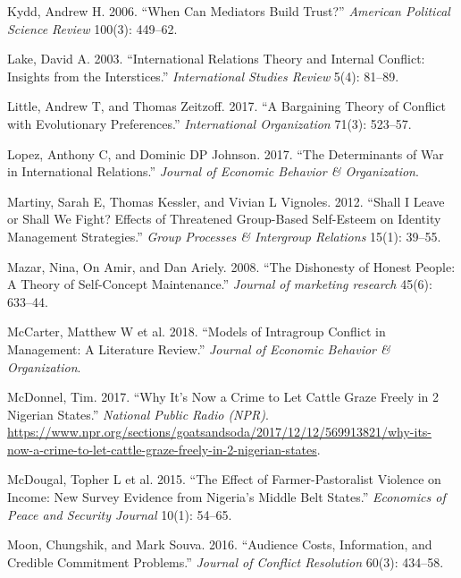 \documentclass[11pt]{article}
\begin{document}
\leavevmode\hypertarget{ref-kydd2006can}{}%
Kydd, Andrew H. 2006. ``When Can Mediators Build Trust?'' \emph{American
Political Science Review} 100(3): 449--62.

\leavevmode\hypertarget{ref-lake2003international}{}%
Lake, David A. 2003. ``International Relations Theory and Internal
Conflict: Insights from the Interstices.'' \emph{International Studies
Review} 5(4): 81--89.

\leavevmode\hypertarget{ref-little2017bargaining}{}%
Little, Andrew T, and Thomas Zeitzoff. 2017. ``A Bargaining Theory of
Conflict with Evolutionary Preferences.'' \emph{International
Organization} 71(3): 523--57.

\leavevmode\hypertarget{ref-lopez2017determinants}{}%
Lopez, Anthony C, and Dominic DP Johnson. 2017. ``The Determinants of
War in International Relations.'' \emph{Journal of Economic Behavior \&
Organization}.

\leavevmode\hypertarget{ref-martiny2012shall}{}%
Martiny, Sarah E, Thomas Kessler, and Vivian L Vignoles. 2012. ``Shall I
Leave or Shall We Fight? Effects of Threatened Group-Based Self-Esteem
on Identity Management Strategies.'' \emph{Group Processes \& Intergroup
Relations} 15(1): 39--55.

\leavevmode\hypertarget{ref-mazar2008dishonesty}{}%
Mazar, Nina, On Amir, and Dan Ariely. 2008. ``The Dishonesty of Honest
People: A Theory of Self-Concept Maintenance.'' \emph{Journal of
marketing research} 45(6): 633--44.

\leavevmode\hypertarget{ref-mccarter2018models}{}%
McCarter, Matthew W et al. 2018. ``Models of Intragroup Conflict in
Management: A Literature Review.'' \emph{Journal of Economic Behavior \&
Organization}.

\leavevmode\hypertarget{ref-mcdonnel2017graze}{}%
McDonnel, Tim. 2017. ``Why It's Now a Crime to Let Cattle Graze Freely
in 2 Nigerian States.'' \emph{National Public Radio (NPR)}.
\url{https://www.npr.org/sections/goatsandsoda/2017/12/12/569913821/why-its-now-a-crime-to-let-cattle-graze-freely-in-2-nigerian-states}.

\leavevmode\hypertarget{ref-mcdougal2015effect}{}%
McDougal, Topher L et al. 2015. ``The Effect of Farmer-Pastoralist
Violence on Income: New Survey Evidence from Nigeria's Middle Belt
States.'' \emph{Economics of Peace and Security Journal} 10(1): 54--65.

\leavevmode\hypertarget{ref-moon2016audience}{}%
Moon, Chungshik, and Mark Souva. 2016. ``Audience Costs, Information,
and Credible Commitment Problems.'' \emph{Journal of Conflict
Resolution} 60(3): 434--58.
\end{document}
